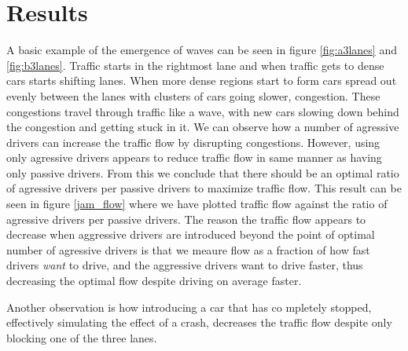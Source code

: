 \documentclass[11pt,a4paper,twocolumn]{article}
\begin{document}
\section{Results}


A basic example of the emergence of waves can be seen in figure \ref{fig:a3lanes} and \ref{fig:b3lanes}. Traffic starts in the rightmost lane and when traffic gets to dense cars starts shifting lanes. When more dense regions start to form cars spread out evenly between the lanes with clusters of cars going slower, congestion. These congestions travel through traffic like a wave, with new cars slowing down behind the congestion and getting stuck in it.
We can observe how a number of agressive drivers can increase the traffic flow by disrupting congestions. However, using only agressive drivers appears to reduce traffic flow in same manner as having only passive drivers. From this we conclude that there should be an optimal ratio of agressive drivers per passive drivers to maximize traffic flow. This result can be seen in figure \ref{jam_flow} where we have plotted traffic flow against the ratio of agressive drivers per passive drivers.
The reason the traffic flow appears to decrease when aggressive drivers are introduced beyond the point of optimal number of agressive drivers is that we meaure flow as a fraction of how fast drivers \textit{want} to drive, and the aggressive drivers want to drive faster, thus decreasing the optimal flow despite driving on average faster.

Another observation is how introducing a car that has co mpletely stopped, effectively simulating the effect of a crash, decreases the traffic flow despite only blocking one of the three lanes.

\end{document}
